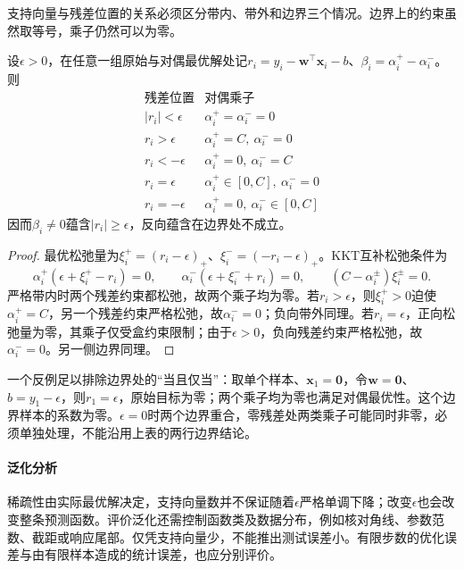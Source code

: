 支持向量与残差位置的关系必须区分带内、带外和边界三个情况。边界上的约束虽然取等号，乘子仍然可以为零。

\begin{theorem}[SVR的样本系数与残差]
  \label{thm:regression-svr-support}
  设$\epsilon>0$，在任意一组原始与对偶最优解处记$r_i=y_i-\bm{w}^{\top}\bm{x}_i-b$、$\beta_i=\alpha_i^+-\alpha_i^-$。则
  \[
    \begin{array}{c|c}
      \text{残差位置}&\text{对偶乘子}\\ \hline
      |r_i|<\epsilon&\alpha_i^+=\alpha_i^-=0\\
      r_i>\epsilon&\alpha_i^+=C,\ \alpha_i^-=0\\
      r_i<-\epsilon&\alpha_i^+=0,\ \alpha_i^-=C\\
      r_i=\epsilon&\alpha_i^+\in[0,C],\ \alpha_i^-=0\\
      r_i=-\epsilon&\alpha_i^+=0,\ \alpha_i^-\in[0,C]
    \end{array}
  \]
  因而$\beta_i\ne0$蕴含$|r_i|\geq\epsilon$，反向蕴含在边界处不成立。
\end{theorem}

\begin{proof}
最优松弛量为$\xi_i^+=(r_i-\epsilon)_+$、$\xi_i^-=(-r_i-\epsilon)_+$。KKT互补松弛条件为
\[
  \alpha_i^+(\epsilon+\xi_i^+-r_i)=0,\qquad
  \alpha_i^-(\epsilon+\xi_i^-+r_i)=0,\qquad
  (C-\alpha_i^\pm)\xi_i^\pm=0.
\]
严格带内时两个残差约束都松弛，故两个乘子均为零。若$r_i>\epsilon$，则$\xi_i^+>0$迫使$\alpha_i^+=C$，另一个残差约束严格松弛，故$\alpha_i^-=0$；负向带外同理。若$r_i=\epsilon$，正向松弛量为零，其乘子仅受盒约束限制；由于$\epsilon>0$，负向残差约束严格松弛，故$\alpha_i^-=0$。另一侧边界同理。
\end{proof}

一个反例足以排除边界处的“当且仅当”：取单个样本、$\bm{x}_1=\bm{0}$，令$\bm{w}=\bm{0}$、$b=y_1-\epsilon$，则$r_1=\epsilon$，原始目标为零；两个乘子均为零也满足对偶最优性。这个边界样本的系数为零。$\epsilon=0$时两个边界重合，零残差处两类乘子可能同时非零，必须单独处理，不能沿用上表的两行边界结论。

\paragraph{泛化分析}
稀疏性由实际最优解决定，支持向量数并不保证随着$\epsilon$严格单调下降；改变$\epsilon$也会改变整条预测函数。评价泛化还需控制函数类及数据分布，例如核对角线、参数范数、截距或响应尾部。仅凭支持向量少，不能推出测试误差小。有限步数的优化误差与由有限样本造成的统计误差，也应分别评价。

